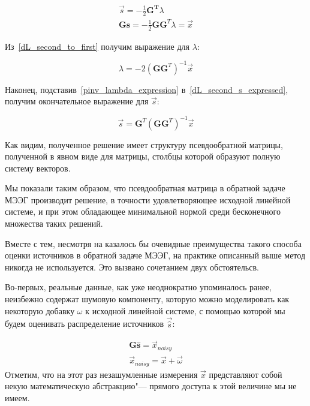 \begin{gather}
    \vec{s} = - \frac{1}{2} \mathbf{G^T}\lambda
    \label{dL_second_s_expressed}\\
    \mathbf{Gs} = - \frac{1}{2} \mathbf{G} \mathbf{G}^T\lambda = \vec{x}
    \label{dL_second_to_first}
\end{gather}

Из~\ref{dL_second_to_first} получим выражение для $\lambda$:

\begin{equation}
    \lambda = - 2 {(\mathbf{G}\mathbf{G}^T)}^{-1}\vec{x}
    \label{pinv_lambda_expression}
\end{equation}

Наконец, подставив~\ref{pinv_lambda_expression} в~\ref{dL_second_s_expressed}, получим
окончательное выражение для $\vec{s}$:

\begin{equation}
    \vec{s} = \mathbf{G}^T{(\mathbf{GG}^T)}^{-1}\vec{x}
\end{equation}

Как видим, полученное решение имеет структуру псевдообратной матрицы,
полученной в явном виде для матрицы, столбцы которой образуют полную систему
векторов.

Мы показали таким образом, что псевдообратная матрица в обратной задаче МЭЭГ
производит решение, в точности удовлетворяющее исходной линейной системе, и при
этом обладающее минимальной нормой среди бесконечного множества таких решений.

Вместе с тем, несмотря на казалось бы очевидные преимущества такого способа
оценки источников в обратной задаче МЭЭГ, на практике описанный выше метод
никогда не используется. Это вызвано сочетанием двух обстоятельсв. 

Во-первых, реальные данные, как уже неоднократно упоминалось ранее, неизбежно
содержат шумовую компоненту, которую можно моделировать как некоторую добавку
$\omega$ к исходной линейной системе, с помощью которой мы будем оценивать
распределение источников $\vec{\hat{s}}$:

\begin{gather}
    \mathbf{G\hat{s}} = \vec{x}_{noisy}
    \label{original_linear_w_noise}\\
    \vec{x}_{noisy} = \vec{x} + \vec{\omega}
\end{gather}
Отметим, что на этот раз незашумленные измерения $\vec{x}$ представляют
собой некую математическую абстракцию"--- прямого доступа к этой величине мы
не имеем.

